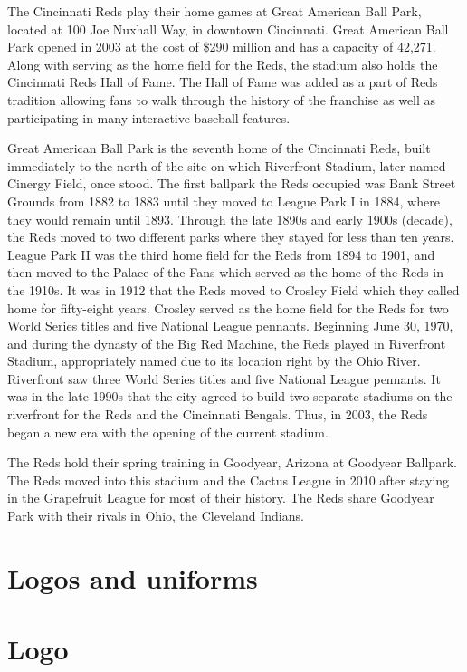 The Cincinnati Reds play their home games at Great American Ball Park,
located at 100 Joe Nuxhall Way, in downtown Cincinnati. Great American
Ball Park opened in 2003 at the cost of \$290 million and has a capacity
of 42,271. Along with serving as the home field for the Reds, the
stadium also holds the Cincinnati Reds Hall of Fame. The Hall of Fame
was added as a part of Reds tradition allowing fans to walk through the
history of the franchise as well as participating in many interactive
baseball features.

Great American Ball Park is the seventh home of the Cincinnati Reds,
built immediately to the north of the site on which Riverfront Stadium,
later named Cinergy Field, once stood. The first ballpark the Reds
occupied was Bank Street Grounds from 1882 to 1883 until they moved to
League Park I in 1884, where they would remain until 1893. Through the
late 1890s and early 1900s (decade), the Reds moved to two different
parks where they stayed for less than ten years. League Park II was the
third home field for the Reds from 1894 to 1901, and then moved to the
Palace of the Fans which served as the home of the Reds in the 1910s. It
was in 1912 that the Reds moved to Crosley Field which they called home
for fifty-eight years. Crosley served as the home field for the Reds for
two World Series titles and five National League pennants. Beginning
June 30, 1970, and during the dynasty of the Big Red Machine, the Reds
played in Riverfront Stadium, appropriately named due to its location
right by the Ohio River. Riverfront saw three World Series titles and
five National League pennants. It was in the late 1990s that the city
agreed to build two separate stadiums on the riverfront for the Reds and
the Cincinnati Bengals. Thus, in 2003, the Reds began a new era with the
opening of the current stadium.

The Reds hold their spring training in Goodyear, Arizona at Goodyear
Ballpark. The Reds moved into this stadium and the Cactus League in 2010
after staying in the Grapefruit League for most of their history. The
Reds share Goodyear Park with their rivals in Ohio, the Cleveland
Indians.

\section{Logos and uniforms}\label{logos-and-uniforms}

\section{Logo}\label{logo}

